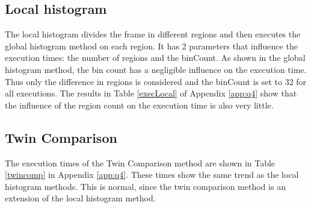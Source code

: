 \subsection{Local histogram}
The local histogram divides the frame in different regions and then executes the global histogram method on each region. It has 2 parameters that influence the execution times: the number of regions and the binCount. As shown in the global histogram method, the bin count has a negligible influence on the execution time. Thus only the difference in regions is considered and the binCount is set to 32 for all executions. The results  in Table \ref{execLocal} of Appendix \ref{app:q4} show that the influence of the region count on the execution time is also very little.
\\
\subsection{Twin Comparison}
The execution times of the Twin Comparison method are shown in Table \ref{twincomp} in Appendix \ref{app:q4}. These times show the same trend as the local histogram methods. This is normal, since the twin comparison method is an extension of the local histogram method.
\\